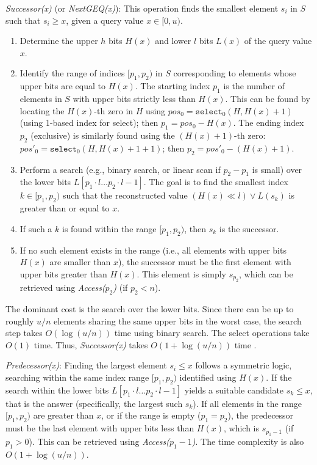 \emph{Successor(x)} (or \emph{NextGEQ(x)}): This operation finds the smallest element $s_i$ in $S$ such that $s_i \ge x$, given a query value $x \in [0, u)$.
\begin{enumerate}
    \item Determine the upper $h$ bits $H(x)$ and lower $l$ bits $L(x)$ of the query value $x$.
    \item Identify the range of indices $[p_1, p_2)$ in $S$ corresponding to elements whose upper bits are equal to $H(x)$. The starting index $p_1$ is the number of elements in $S$ with upper bits strictly less than $H(x)$. This can be found by locating the $H(x)$-th zero in $H$ using $pos_0 = \texttt{select}_0(H, H(x)+1)$ (using 1-based index for select); then $p_1 = pos_0 - H(x)$. The ending index $p_2$ (exclusive) is similarly found using the $(H(x)+1)$-th zero: $pos'_0 = \texttt{select}_0(H, H(x)+1+1)$; then $p_2 = pos'_0 - (H(x)+1)$.
    \item Perform a search (e.g., binary search, or linear scan if $p_2 - p_1$ is small) over the lower bits $L[p_1 \cdot l \dots p_2 \cdot l - 1]$. The goal is to find the smallest index $k \in [p_1, p_2)$ such that the reconstructed value $(H(x) \ll l) \lor L(s_k)$ is greater than or equal to $x$.
    \item If such a $k$ is found within the range $[p_1, p_2)$, then $s_k$ is the successor.
    \item If no such element exists in the range (i.e., all elements with upper bits $H(x)$ are smaller than $x$), the successor must be the first element with upper bits greater than $H(x)$. This element is simply $s_{p_2}$, which can be retrieved using \emph{Access($p_2$)} (if $p_2 < n$).
\end{enumerate}
The dominant cost is the search over the lower bits. Since there can be up to roughly $u/n$ elements sharing the same upper bits in the worst case, the search step takes $O(\log(u/n))$ time using binary search. The select operations take $O(1)$ time. Thus, \emph{Successor(x)} takes $O(1 + \log(u/n))$ time \cite{pibiri_et_al, ferragina2023pearls}.

\emph{Predecessor(x)}: Finding the largest element $s_i \le x$ follows a symmetric logic, searching within the same index range $[p_1, p_2)$ identified using $H(x)$. If the search within the lower bits $L[p_1 \cdot l \dots p_2 \cdot l - 1]$ yields a suitable candidate $s_k \le x$, that is the answer (specifically, the largest such $s_k$). If all elements in the range $[p_1, p_2)$ are greater than $x$, or if the range is empty ($p_1=p_2$), the predecessor must be the last element with upper bits less than $H(x)$, which is $s_{p_1-1}$ (if $p_1 > 0$). This can be retrieved using \emph{Access($p_1-1$)}. The time complexity is also $O(1 + \log(u/n))$.

